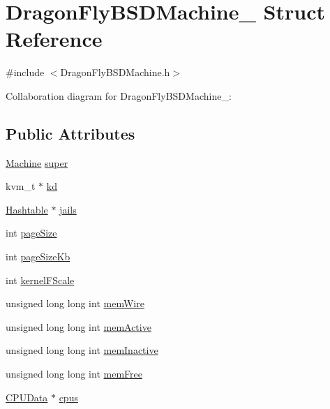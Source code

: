\hypertarget{structDragonFlyBSDMachine__}{}\section{Dragon\+Fly\+B\+S\+D\+Machine\+\_\+ Struct Reference}
\label{structDragonFlyBSDMachine__}


{\ttfamily \#include $<$Dragon\+Fly\+B\+S\+D\+Machine.\+h$>$}



Collaboration diagram for Dragon\+Fly\+B\+S\+D\+Machine\+\_\+\+:
\subsection*{Public Attributes}
\begin{DoxyCompactItemize}
\item 
\hyperlink{Machine_8h_aa3706f95e4706b9d02979efcabb1341d}{Machine} \hyperlink{structDragonFlyBSDMachine___a83e5b49a54d0b6242944785583eb8f67}{super}
\item 
kvm\+\_\+t $\ast$ \hyperlink{structDragonFlyBSDMachine___a945dcaae364e390576037d9cd9484604}{kd}
\item 
\hyperlink{Hashtable_8h_af67f943dab16c5d7d465c18053edf47f}{Hashtable} $\ast$ \hyperlink{structDragonFlyBSDMachine___a73299ff665927ed69c64b914e5e0e49f}{jails}
\item 
int \hyperlink{structDragonFlyBSDMachine___af2bf566d788c636fed93f36109c7e0ad}{page\+Size}
\item 
int \hyperlink{structDragonFlyBSDMachine___a5cded64d6ea8a165709afbf94ef955d3}{page\+Size\+Kb}
\item 
int \hyperlink{structDragonFlyBSDMachine___a2b91823a65b6ef9b1a335320a3f4489f}{kernel\+F\+Scale}
\item 
unsigned long long int \hyperlink{structDragonFlyBSDMachine___a0298fe1ffa5122859bd0299382087cf4}{mem\+Wire}
\item 
unsigned long long int \hyperlink{structDragonFlyBSDMachine___ad18c2994c8e6836b4d9c9279a245b619}{mem\+Active}
\item 
unsigned long long int \hyperlink{structDragonFlyBSDMachine___a3ac1fd167be3164011d0b23410089d72}{mem\+Inactive}
\item 
unsigned long long int \hyperlink{structDragonFlyBSDMachine___a10882a0020fcdc4d26cf00000db39883}{mem\+Free}
\item 
\hyperlink{DragonFlyBSDMachine_8h_a144f55b34d84d75d470d730435fef363}{C\+P\+U\+Data} $\ast$ \hyperlink{structDragonFlyBSDMachine___aaac59730b882b3b1cf0c30444e30aa52}{cpus}

\end{DoxyCompactItemize}
